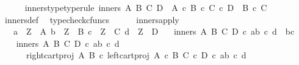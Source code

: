 \begin{isabellebody}
\ \ \ \ {\isasymrangle}{\isachardoublequoteclose}\isanewline
\isanewline
{}\isamarkupfalse%
\ inners{\isacharunderscore}{\kern0pt}type{\isacharbrackleft}{\kern0pt}type{\isacharunderscore}{\kern0pt}rule{\isacharbrackright}{\kern0pt}{\isacharcolon}{\kern0pt}\ {\isachardoublequoteopen}inners\ A\ B\ C\ D\ {\isacharcolon}{\kern0pt}\ {\isacharparenleft}{\kern0pt}A\ {\isasymtimes}\isactrlsub c\ B{\isacharparenright}{\kern0pt}\ {\isasymtimes}\isactrlsub c\ {\isacharparenleft}{\kern0pt}C\ {\isasymtimes}\isactrlsub c\ D{\isacharparenright}{\kern0pt}\ {\isasymrightarrow}\ {\isacharparenleft}{\kern0pt}B\ {\isasymtimes}\isactrlsub c\ C{\isacharparenright}{\kern0pt}{\isachardoublequoteclose}\isanewline
%
\isadelimproof
\ \ %
\endisadelimproof
%
\isatagproof
{}\isamarkupfalse%
\ inners{\isacharunderscore}{\kern0pt}def\ \isamarkupfalse%
\ typecheck{\isacharunderscore}{\kern0pt}cfuncs%
\endisatagproof
{\isafoldproof}%
%
\isadelimproof
\isanewline
%
\endisadelimproof
\ \ \ \ \isanewline
{}\isamarkupfalse%
\ inners{\isacharunderscore}{\kern0pt}apply{\isacharcolon}{\kern0pt}\isanewline
\ \ \ {\isachardoublequoteopen}a\ {\isacharcolon}{\kern0pt}\ Z\ {\isasymrightarrow}\ A{\isachardoublequoteclose}\ {\isachardoublequoteopen}b\ {\isacharcolon}{\kern0pt}\ Z\ {\isasymrightarrow}\ B{\isachardoublequoteclose}\ {\isachardoublequoteopen}c\ {\isacharcolon}{\kern0pt}\ Z\ {\isasymrightarrow}\ C{\isachardoublequoteclose}\ {\isachardoublequoteopen}d\ {\isacharcolon}{\kern0pt}\ Z\ {\isasymrightarrow}\ D{\isachardoublequoteclose}\isanewline
\ \ \ {\isachardoublequoteopen}inners\ A\ B\ C\ D\ {\isasymcirc}\isactrlsub c\ {\isasymlangle}{\isasymlangle}a{\isacharcomma}{\kern0pt}b{\isasymrangle}{\isacharcomma}{\kern0pt}\ {\isasymlangle}c{\isacharcomma}{\kern0pt}\ d{\isasymrangle}{\isasymrangle}\ {\isacharequal}{\kern0pt}\ {\isasymlangle}b{\isacharcomma}{\kern0pt}c{\isasymrangle}{\isachardoublequoteclose}\isanewline
%
\isadelimproof
%
\endisadelimproof
%
\isatagproof
{}\isamarkupfalse%
\ {\isacharminus}{\kern0pt}\isanewline
\ \ \isamarkupfalse%
\ {\isachardoublequoteopen}inners\ A\ B\ C\ D\ {\isasymcirc}\isactrlsub c\ {\isasymlangle}{\isasymlangle}a{\isacharcomma}{\kern0pt}b{\isasymrangle}{\isacharcomma}{\kern0pt}\ {\isasymlangle}c{\isacharcomma}{\kern0pt}\ d{\isasymrangle}{\isasymrangle}\ {\isacharequal}{\kern0pt}\ {\isasymlangle}\isanewline
\ \ \ \ \ \ right{\isacharunderscore}{\kern0pt}cart{\isacharunderscore}{\kern0pt}proj\ A\ B\ {\isasymcirc}\isactrlsub c\ left{\isacharunderscore}{\kern0pt}cart{\isacharunderscore}{\kern0pt}proj\ {\isacharparenleft}{\kern0pt}A\ {\isasymtimes}\isactrlsub c\ B{\isacharparenright}{\kern0pt}\ {\isacharparenleft}{\kern0pt}C\ {\isasymtimes}\isactrlsub c\ D{\isacharparenright}{\kern0pt}\ {\isasymcirc}\isactrlsub c\ {\isasymlangle}{\isasymlangle}a{\isacharcomma}{\kern0pt}b{\isasymrangle}{\isacharcomma}{\kern0pt}\ {\isasymlangle}c{\isacharcomma}{\kern0pt}\ d{\isasymrangle}{\isasymrangle}{\isacharcomma}{\kern0pt}\isanewline

\end{isabellebody}
